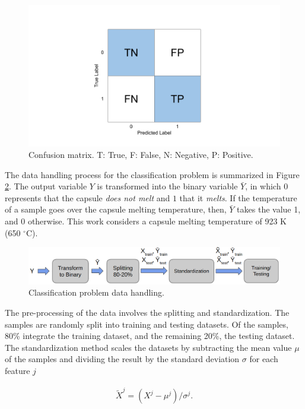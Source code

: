 \begin{figure}[htbp!] %
  \centering
  \includegraphics[width=0.7\linewidth]{figures/confusion_matrix}
  \caption{Confusion matrix. T: True, F: False, N: Negative, P: Positive.}
  \label{fig:conf-matrix}
\end{figure}

The data handling process for the classification problem is summarized in Figure \ref{fig:data-class}.
The output variable $Y$ is transformed into the binary variable $\bar{Y}$, in which $0$ represents that the capsule \textit{does not melt} and $1$ that it \textit{melts}.
If the temperature of a sample goes over the capsule melting temperature, then, $\bar{Y}$ takes the value 1, and 0 otherwise.
This work considers a capsule melting temperature of 923 K (650 $^{\circ}$C).

\begin{figure}[htbp!] %
  \centering
  \includegraphics[width=0.7\linewidth]{figures/data-pross-classification}
  \caption{Classification problem data handling.}
  \label{fig:data-class}
\end{figure}

The pre-processing of the data involves the splitting and standardization.
The samples are randomly split into training and testing datasets.
Of the samples, 80\% integrate the training dataset, and the remaining 20\%, the testing dataset.
The standardization method scales the datasets by subtracting the mean value $\mu$ of the samples and dividing the result by the standard deviation $\sigma$ for each feature $j$

\begin{align}
\tilde{X}^j = (X^j - \mu^j) / \sigma^j.
\end{align}

